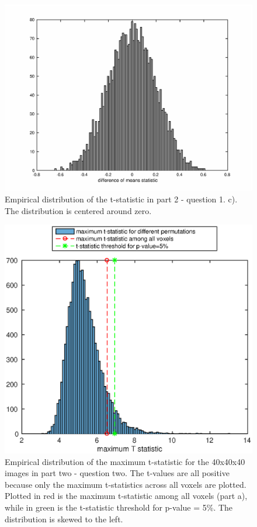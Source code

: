 \documentclass[11pt,a4paper,oneside]{report}
\begin{document}
\begin{figure}[H]
\centering
 \includegraphics[scale = 0.7]{figures/p21_c.eps}
 \caption{Empirical distribution of the t-statistic in part 2 - question 1. c). The distribution is centered around zero.}
 \label{p21c}
\end{figure}

\begin{figure}[H]
\centering
 \includegraphics[scale = 0.9]{figures/p22_b.eps}
 \caption{Empirical distribution of the maximum t-statistic for the 40x40x40 images in part two - question two. The t-values are all positive because only the maximum t-statistics across all voxels are plotted. Plotted in red is the maximum t-statistic among all voxels (part a), while in green is the t-statistic threshold for p-value = 5\%. The distribution is skewed to the left.}
 \label{p22b}
\end{figure}
\end{document}

